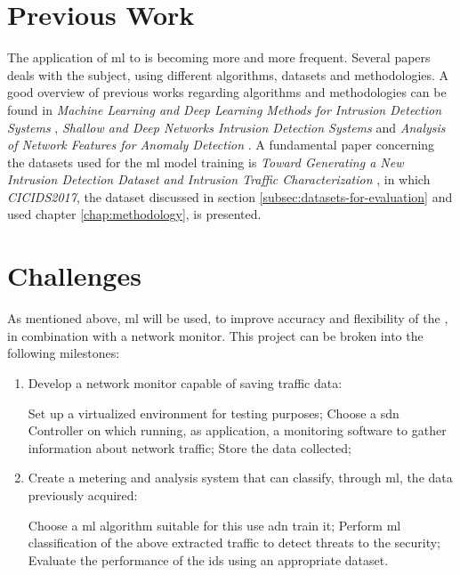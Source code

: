 
\section{Previous Work}
\label{sec:prev-work}

The application of \gls{ml} to  is becoming more and more frequent. Several papers deals with the subject, using different algorithms, datasets and methodologies. A good overview of previous works regarding algorithms and methodologies can be found in \textit{Machine Learning and Deep Learning Methods for Intrusion Detection Systems} \cite{Liu2019}, \textit{Shallow and Deep Networks Intrusion Detection Systems} \cite{Hodo2017} and \textit{Analysis of Network Features for Anomaly Detection} \cite{Iglesias2015}. A fundamental paper concerning the datasets used for the \gls{ml} model training is \textit{Toward Generating a New Intrusion Detection Dataset and Intrusion Traffic Characterization} \cite{icissp17}, in which \textit{CICIDS2017}, the dataset discussed in section \ref{subsec:datasets-for-evaluation} and used chapter \ref{chap:methodology}, is presented. 


\section{Challenges}
\label{sec:objectives}

As mentioned above, \gls{ml} will be used, to improve accuracy and flexibility of the , in combination with a network monitor. This project can be broken into the following milestones:

\begin{enumerate}
    \item Develop a network monitor capable of saving traffic data:
    \begin{itemize}
        \itemAR Set up a virtualized environment for testing purposes;
        \itemAR Choose a \gls{sdn} Controller on which running, as application, a monitoring software to gather information about network traffic;
        \itemAR Store the data collected;
    \end{itemize}
    \item Create a metering and analysis system that can classify, through \gls{ml}, the data previously acquired:
    \begin{itemize}
        \itemAR Choose a \gls{ml} algorithm suitable for this use adn train it;
        \itemAR Perform \gls{ml} classification of the above extracted traffic to detect threats to the security;
        \itemAR Evaluate the performance of the \gls{ids} using an appropriate dataset.
    \end{itemize}
\end{enumerate}

